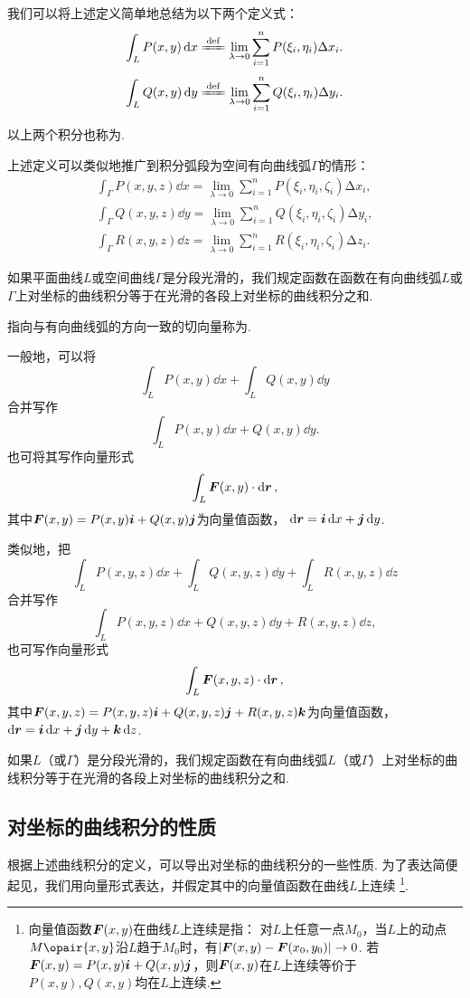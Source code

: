 我们可以将上述定义简单地总结为以下两个定义式：
\[
\int_L P(x,y) \dd{x}
\defeq \lim\limits_{\lambda\to0}
	\sum\limits_{i=1}^n P(\xi_i,\eta_i) \increment x_i.
\]\[
\int_L Q(x,y) \dd{y}
\defeq \lim\limits_{\lambda\to0}
	\sum\limits_{i=1}^n Q(\xi_i,\eta_i) \increment y_i.
\]

以上两个积分也称为.

上述定义可以类似地推广到积分弧段为空间有向曲线弧\(\Gamma\)的情形：
\begingroup
\def\intgamma#1#2{\int_{\Gamma} #1(x,y,z) \dd{#2} = \lim\limits_{\lambda\to0} \sum\limits_{i=1}^n #1(\xi_i,\eta_i,\zeta_i) \increment #2_i}
\begin{gather*}
\intgamma{P}{x}, \\
\intgamma{Q}{y}, \\
\intgamma{R}{z}.
\end{gather*}
\endgroup

如果平面曲线\(L\)或空间曲线\(\Gamma\)是分段光滑的，我们规定函数在函数在有向曲线弧\(L\)或\(\Gamma\)上对坐标的曲线积分等于在光滑的各段上对坐标的曲线积分之和.

指向与有向曲线弧的方向一致的切向量称为.

一般地，可以将\[
\int_L P(x,y) \dd{x} + \int_L Q(x,y) \dd{y}
\]合并写作\[
\int_L P(x,y) \dd{x} + Q(x,y) \dd{y}.
\]也可将其写作向量形式\[
\int_L \boldsymbol{F}(x,y) \cdot \dd{\boldsymbol{r}},
\]其中\(\boldsymbol{F}(x,y) = P(x,y) \boldsymbol{i} + Q(x,y) \boldsymbol{j}\)为向量值函数，
\(\dd{\boldsymbol{r}} = \boldsymbol{i} \dd{x} + \boldsymbol{j} \dd{y}\).

类似地，把\[
\int_L P(x,y,z) \dd{x} + \int_L Q(x,y,z) \dd{y} + \int_L R(x,y,z) \dd{z}
\]合并写作\[
\int_L P(x,y,z) \dd{x} + Q(x,y,z) \dd{y} + R(x,y,z) \dd{z},
\]也可写作向量形式\[
\int_L \boldsymbol{F}(x,y,z) \cdot \dd{\boldsymbol{r}},
\]其中\(\boldsymbol{F}(x,y,z) = P(x,y,z)\boldsymbol{i} + Q(x,y,z)\boldsymbol{j} + R(x,y,z)\boldsymbol{k}\)为向量值函数，
\(\dd{\boldsymbol{r}} = \boldsymbol{i} \dd{x} + \boldsymbol{j} \dd{y} + \boldsymbol{k} \dd{z}\).

如果\(L\)（或\(\Gamma\)）是分段光滑的，我们规定函数在有向曲线弧\(L\)（或\(\Gamma\)）上对坐标的曲线积分等于在光滑的各段上对坐标的曲线积分之和.

\subsection{对坐标的曲线积分的性质}
根据上述曲线积分的定义，可以导出对坐标的曲线积分的一些性质.
为了表达简便起见，我们用向量形式表达，并假定其中的向量值函数在曲线\(L\)上连续%
\footnote{向量值函数\(\boldsymbol{F}(x,y)\)在曲线\(L\)上连续是指：%
对\(L\)上任意一点\(M_0\)，当\(L\)上的动点\(M\opair{x,y}\)沿\(L\)趋于\(M_0\)时，有\(\abs{\boldsymbol{F}(x,y)-\boldsymbol{F}(x_0,y_0)}\to0\).%
若\(\boldsymbol{F}(x,y)=P(x,y)\boldsymbol{i}+Q(x,y)\boldsymbol{j}\)，则\(\boldsymbol{F}(x,y)\)在\(L\)上连续等价于\(P(x,y),Q(x,y)\)均在\(L\)上连续.}.

